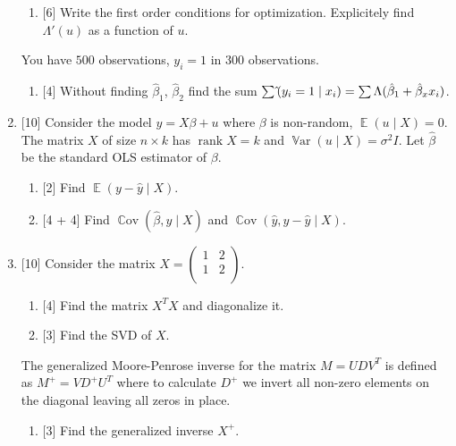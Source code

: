 \documentclass[12pt]{article}
\DeclareMathOperator{\Cov}{\mathbb{C}ov}
\DeclareMathOperator{\Var}{\mathbb{V}ar}
\DeclareMathOperator{\rank}{rank}
\let\P\relax
\DeclareMathOperator{\P}{\mathbb{P}}
\DeclareMathOperator{\E}{\mathbb{E}}
\newcommand{\hb}{\hat{\beta}}
\begin{document}
\begin{enumerate}
    \begin{enumerate}
        \item {[6]} Write the first order conditions for optimization. 
        Explicitely find $\Lambda'(u)$ as a function of $u$.
    \end{enumerate}
    You have $500$ observations, $y_i = 1$ in $300$ observations. 
    \begin{enumerate}[resume]
        \item {[4]} Without finding $\hb_1$, $\hb_2$ find the sum $\sum \hat{\P}(y_i = 1 \mid x_i) = \sum \Lambda(\hb_1 + \hb_x x_i)$.
    \end{enumerate}  

    \item {[10]} Consider the model $y = X\beta + u$ where $\beta$ is non-random, $\E(u \mid X ) = 0$. 
    The matrix $X$ of size $n\times k$ has $\rank X = k$ and $\Var(u \mid X) = \sigma^2 I$.
    Let $\hb$ be the standard OLS estimator of $\beta$.

    \begin{enumerate}
        \item {[2]} Find $\E(y - \hat y \mid X)$.
        \item {[4 + 4]} Find $\Cov(\hb, y \mid X)$ and $\Cov(\hat y, y - \hat y \mid X)$.
    \end{enumerate}

    \item {[10]} Consider the matrix $X = \begin{pmatrix}
        1 & 2 \\
        1 & 2 \\
    \end{pmatrix}$.
    
    \begin{enumerate}
        \item {[4]} Find the matrix $X^TX$ and diagonalize it. 
        \item {[3]} Find the SVD of $X$. 
    \end{enumerate}
    
    The generalized Moore-Penrose inverse for the matrix $M = U D V^T$ is defined as
    $M^+ = V D^+ U^T$ where to calculate $D^+$ we invert all non-zero elements on the diagonal leaving all zeros in place. 
    \begin{enumerate}[resume]
        \item {[3]} Find the generalized inverse $X^+$.
    \end{enumerate}



\end{enumerate}
\end{document}
